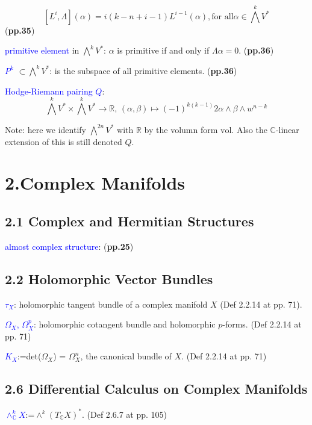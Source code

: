 \documentclass{book}
\numberwithin{equation}{subsection} %
\theoremstyle{definition}
\begin{document}
$$[L^i,\Lambda](\alpha)= i(k-n+i-1)L^{i-1}(\alpha),\text{for all}
    \alpha\in\bigwedge^k V^*$$
(\textbf{pp.35})

    \textcolor{blue}{primitive element} in $\bigwedge^kV^*$:
        $\alpha$ is primitive if and only if $\Lambda\alpha=0$.
    (\textbf{pp.36})

    \textcolor{blue}{$P^k$} $\subset\bigwedge^kV^*$: is the subspace
    of all primitive elements.
    (\textbf{pp.36})

    \textcolor{blue}{Hodge-Riemann pairing $Q$}:
    $$\bigwedge^kV^*\times\bigwedge^kV^*\to \mathbb{R}\text{, }
     (\alpha,\beta)\mapsto (-1)^{k(k-1)}{2}\alpha\wedge\beta\wedge w^{n-k}$$

    Note: here we identify $\bigwedge^{2n}V^*$ with $\mathbb{R}$ 
    by the volumn form $\text{vol}$. Also the $\mathbb{C}$-linear 
    extension of this is still denoted $Q$.

\section{2.Complex Manifolds}

    \subsection{2.1 Complex and Hermitian Structures}
    \textcolor{blue}{almost complex structure}: (\textbf{pp.25})
	\subsection{2.2 Holomorphic Vector Bundles}

    \textcolor{blue}{$\tau_X$}: holomorphic tangent bundle of a complex manifold $X$ (Def 2.2.14 at pp. 71).
    
    \textcolor{blue}{$\varOmega_X$, $\varOmega^p_X$}: holomorphic cotangent bundle and holomorphic $p$-forms. (Def 2.2.14 at pp. 71)
    
    \textcolor{blue}{$K_X$}:=det($\varOmega_X$) = $\varOmega_X^n$, the canonical bundle of $X$. (Def 2.2.14 at pp. 71)

    \subsection{2.6 Differential Calculus on Complex Manifolds}

    \textcolor{blue}{$\wedge^k_{\mathbb{C}}X$}:=$\wedge^k(T_{\mathbb{C}}X)^*$. (Def 2.6.7 at pp. 105)
    
\end{document}
